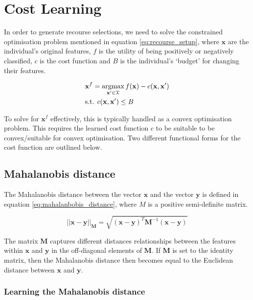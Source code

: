 \chapter{Cost Learning}

In order to generate recourse selections, we need to solve the constrained optimisation problem mentioned in equation \ref{eq:recourse_setup}, where $\mathbf{x}$ are the individual's original features, $f$ is the utility of being positively or negatively classified, $c$ is the cost function and $B$ is the individual's `budget' for changing their features.

\begin{align}
	& \mathbf{x}^f = \operatorname*{argmax}_{\mathbf{x}' \in \mathbf{\mathcal{X}}} f(\mathbf{x}) - c(\mathbf{x}, \mathbf{x}') \\
	& \text{s.t. } c(\mathbf{x}, \mathbf{x}') \leq B \nonumber
\end{align}

To solve for $\mathbf{x}^f$ effectively, this is typically handled as a convex optimisation problem. This requires the learned cost function $c$ to be suitable to be convex/suitable for convex optimisation. Two different functional forms for the cost function are outlined below.


\section{Mahalanobis distance}

The Mahalanobis distance between the vector $\mathbf{x}$ and the vector $\mathbf{y}$ is defined in equation \ref{eq:mahalanbobis_distance}, where $M$ is a positive semi-definite matrix.

\begin{equation} \label{eq:mahalanbobis_distance}
	||\mathbf{x-y}||_{\mathbf{M}} = \sqrt{(\mathbf{x-y})^T\mathbf{M}^{-1}(\mathbf{x-y})}
\end{equation}

The matrix $\mathbf{M}$ captures different distances relationships between the features within $\mathbf{x}$ and $\mathbf{y}$ in the off-diagonal elements of $\mathbf{M}$. If $\mathbf{M}$ is set to the identity matrix, then the Mahalanobis distance then becomes equal to the Euclidean distance between $\mathbf{x}$ and $\mathbf{y}$. \\

\subsection{Learning the Mahalanobis distance}

